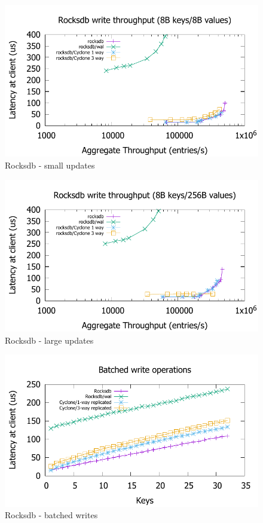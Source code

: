 \documentclass[twocolumn]{article}
\begin{document}
\begin{figure}
    \centering
    \includegraphics[scale=0.6]{results2/rocksdb.pdf}
    \caption{Rocksdb - small updates}
    \label{fig:rocksdb}
  \end{figure}
   
  \begin{figure}
    \includegraphics[scale=0.6]{results2/rocksdb_256.pdf}
    \caption{Rocksdb - large updates}
    \label{fig:rocksdb_256}
  \end{figure}
   
  \begin{figure}
    \includegraphics[scale=0.6]{results2/rocksdb_multi.pdf}
    \caption{Rocksdb - batched writes}
    \label{fig:rocksdb_multi}
\end{figure}
\end{document}
